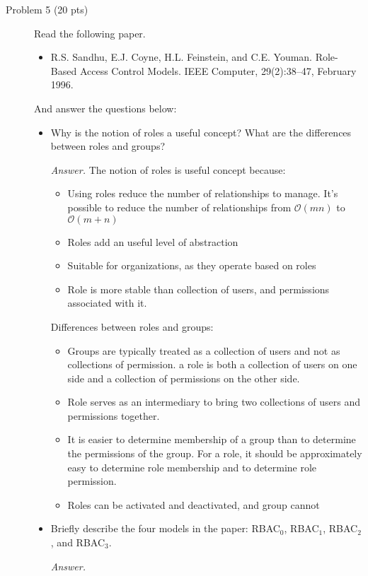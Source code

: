 \documentclass[11pt]{article}
\begin{document}
\begin{description}
 \item[Problem 5 (20 pts)]
Read the following paper. 
\begin{itemize}
 \item
R.S. Sandhu, E.J. Coyne, H.L. Feinstein, and C.E. Youman. Role-Based Access Control
Models. IEEE Computer, 29(2):38--47, February 1996.
\end{itemize}
\noindent And answer the questions below:
{\bf
\begin{itemize}
 \item
Why is the notion of roles a useful concept?  What are the differences between roles and groups?
\begin{mdframed}
	\textit{Answer. }
	The notion of roles is useful concept because: 
	\begin{itemize}
	 	\item Using roles reduce the number of relationships to manage. It's possible to reduce the number of relationships from $\mathcal O(mn)$ to $\mathcal O(m+n)$
	 	\item Roles add an useful level of abstraction
	 	\item Suitable for organizations, as they operate based on roles
	 	\item Role is more stable than collection of users, and permissions associated with it.
	 \end{itemize} 
	 Differences between roles and groups: 
	 \begin{itemize}
	 	\item Groups are typically treated as a collection of users and not as collections of permission. a role is both a collection of users on one side and a collection of permissions on the other side.  
	 	\item Role serves as an intermediary to bring two collections of users and permissions together.
	 	\item It is easier to determine membership of a group than to determine the permissions of the group. For a role, it should be approximately easy to determine role membership and to determine role permission.
	 	\item Roles can be activated and deactivated, and group cannot
	 \end{itemize}
\end{mdframed}
 \item
Briefly describe the four models in the paper: RBAC$_0$, RBAC$_1$, RBAC$_2$, and RBAC$_3$.
\begin{mdframed}
	\textit{Answer. }
	\\

\end{mdframed}
\end{itemize}}
\end{description}
\end{document}
